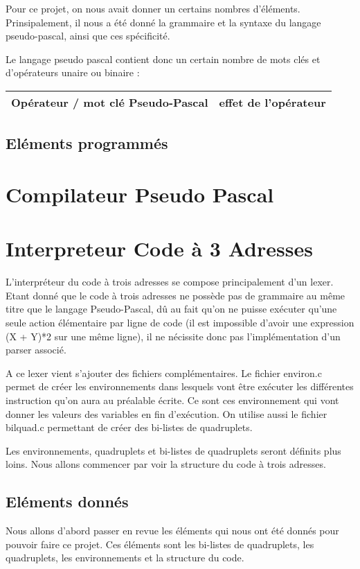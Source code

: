 \documentclass{article}
\begin{document}
Pour ce projet, on nous avait donner un certains nombres d'éléments. Prinsipalement, il nous a été donné la grammaire et la syntaxe du langage pseudo-pascal, ainsi que ces spécificité.

Le langage pseudo pascal contient donc un certain nombre de mots clés et d'opérateurs unaire ou binaire :

\begin{tabular}{|l|l|}
  \hline
  Opérateur / mot clé Pseudo-Pascal  & effet de l'opérateur \\
  \hline
  \hline

\end{tabular}


\subsection{Eléments programmés}



\newpage
\section{Compilateur Pseudo Pascal}



\newpage
\section{Interpreteur Code à 3 Adresses}

L'interpréteur du code à trois adresses se compose principalement d'un lexer. Etant donné que le code à trois adresses ne possède pas de grammaire au même titre que le langage Pseudo-Pascal,
dû au fait qu'on ne puisse exécuter qu'une seule action élémentaire par ligne de code (il est impossible d'avoir une expression (X + Y)*2 sur une même ligne), il ne nécissite donc pas l'implémentation d'un parser associé.

A ce lexer vient s'ajouter des fichiers complémentaires. Le fichier environ.c permet de créer les environnements dans lesquels vont être exécuter les différentes instruction qu'on aura au préalable écrite. Ce sont ces environnement qui vont donner les valeurs des variables en fin d'exécution.
On utilise aussi le fichier bilquad.c permettant de créer des bi-listes de quadruplets.

Les environnements, quadruplets et bi-listes de quadruplets seront définits plus loins. Nous allons commencer par voir la structure du code à trois adresses.


\subsection{Eléments donnés}
Nous allons d'abord passer en revue les éléments qui nous ont été donnés pour pouvoir faire ce projet. Ces éléments sont les bi-listes de quadruplets, les quadruplets, les environnements et la structure du code.
\end{document}
